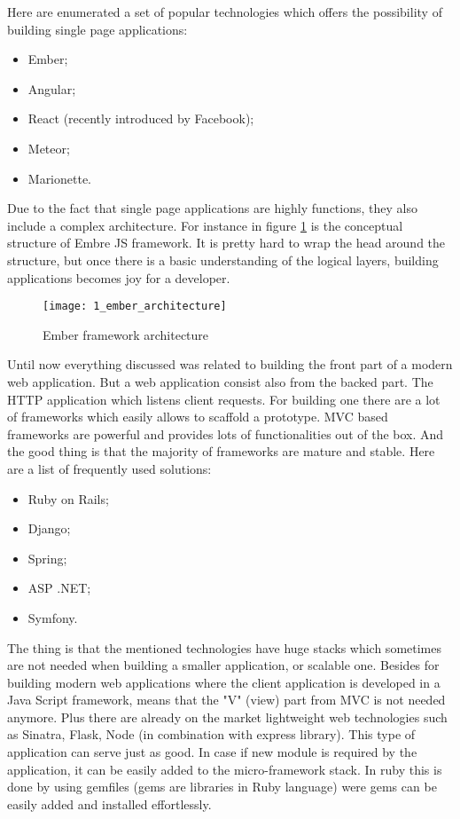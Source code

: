 Here are enumerated a set of popular technologies which offers the possibility of building single page applications:
\begin{itemize}
    \item Ember;
    \item Angular;
    \item React (recently introduced by Facebook\cite{react});
    \item Meteor;
    \item Marionette.
\end{itemize}
Due to the fact that single page applications are highly functions, they also include a complex architecture. For instance in figure \ref{ember_architecture} is the conceptual structure of Embre JS framework. It is pretty hard to wrap the head around the structure, but once there is a basic understanding of the logical layers, building applications becomes joy for a developer.

\begin{figure}[!ht]
\centering
\texttt{[image: 1\_ember\_architecture]}
\caption{Ember framework architecture}\label{ember_architecture}
\end{figure}

Until now everything discussed was related to building the front part of a modern web application. But a web application consist also from the backed part. The HTTP application which listens client requests. For building one there are a lot of frameworks which easily allows to scaffold a prototype. MVC based frameworks are powerful and provides lots of functionalities out of the box. And the good thing is that the majority of frameworks are mature and stable. Here are a list of frequently used solutions:
\begin{itemize}
    \item Ruby on Rails;
    \item Django;
    \item Spring;
    \item ASP .NET;
    \item Symfony.
\end{itemize}
The thing is that the mentioned technologies have huge stacks which sometimes are not needed when building a smaller application, or scalable one. Besides for building modern web applications where the client application is developed in a Java Script framework, means that the "V" (view) part from MVC is not needed anymore. Plus there are already on the market lightweight web technologies such as Sinatra, Flask, Node (in combination with express library). This type of application can serve just as good. In case if new module is required by the application, it can be easily added to the micro-framework stack. In ruby this is done by using gemfiles (gems are libraries in Ruby language) were gems can be easily added and installed effortlessly.

